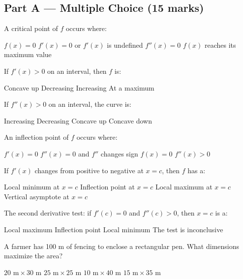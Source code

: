 \documentclass[addpoints]{exam}
\begin{document}
\newpage
\begin{questions}

\section*{Part A --- Multiple Choice (15 marks)}
\vspace{5mm}

\question[1] A critical point of $f$ occurs where:
\begin{choices}
    \choice $f(x) = 0$
    \correctchoice $f'(x) = 0$ or $f'(x)$ is undefined
    \choice $f''(x) = 0$
    \choice $f(x)$ reaches its maximum value
\end{choices}

\question[1] If $f'(x) > 0$ on an interval, then $f$ is:
\begin{choices}
    \choice Concave up
    \choice Decreasing
    \correctchoice Increasing
    \choice At a maximum
\end{choices}

\question[1] If $f''(x) > 0$ on an interval, the curve is:
\begin{choices}
    \choice Increasing
    \choice Decreasing
    \correctchoice Concave up
    \choice Concave down
\end{choices}

\question[1] An inflection point of $f$ occurs where:
\begin{choices}
    \choice $f'(x) = 0$
    \correctchoice $f''(x) = 0$ and $f''$ changes sign
    \choice $f(x) = 0$
    \choice $f''(x) > 0$
\end{choices}

\question[1] If $f'(x)$ changes from positive to negative at $x = c$, then $f$ has a:
\begin{choices}
    \choice Local minimum at $x = c$
    \choice Inflection point at $x = c$
    \correctchoice Local maximum at $x = c$
    \choice Vertical asymptote at $x = c$
\end{choices}

\question[1] The second derivative test: if $f'(c) = 0$ and $f''(c) > 0$, then $x = c$ is a:
\begin{choices}
    \choice Local maximum
    \choice Inflection point
    \correctchoice Local minimum
    \choice The test is inconclusive
\end{choices}

\question[1] A farmer has 100 m of fencing to enclose a rectangular pen. What dimensions
maximize the area?
\begin{choices}
    \choice $20 \text{ m} \times 30 \text{ m}$
    \correctchoice $25 \text{ m} \times 25 \text{ m}$
    \choice $10 \text{ m} \times 40 \text{ m}$
    \choice $15 \text{ m} \times 35 \text{ m}$
\end{choices}


\end{questions}
\end{document}
